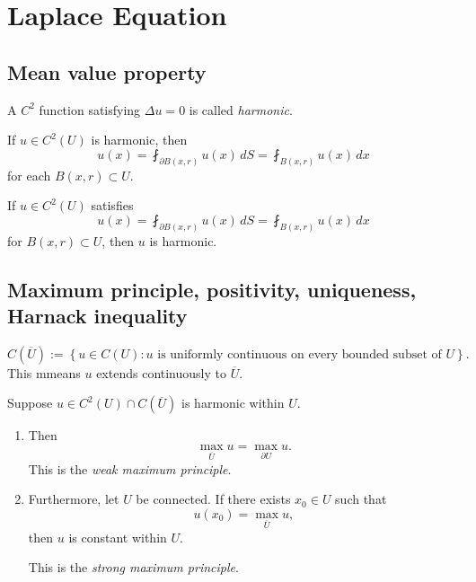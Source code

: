 \chapter{Laplace Equation}

\section{Mean value property}

\begin{definition}
A $C^2$ function satisfying $\Delta u=0$ is called \emph{harmonic}.
\end{definition}

\begin{theorem}
If $u\in C^2(U)$ is harmonic, then
$$
u(x)= \fint_{\partial B(x,r)} u(x)\,dS
= \fint_{B(x,r)} u(x)\,dx
$$
for each $B(x,r)\subset U$.
\end{theorem}

\begin{theorem}
If $u\in C^2(U)$ satisfies
$$
u(x)= \fint_{\partial B(x,r)} u(x)\,dS
= \fint_{B(x,r)} u(x)\,dx
$$
for $B(x,r)\subset U$,
then $u$ is harmonic.
\end{theorem}


\section{Maximum principle, positivity, uniqueness, Harnack inequality}

\begin{definition}
    $
    C(\overline{U})
    :=
    \left\{
    u\in C(U): u \text{ is uniformly continuous on every bounded subset of } U
    \right\}.
    $
    This mmeans $u$ extends continuously to $\overline{U}$.
    \end{definition}

\begin{theorem}
Suppose $u\in C^2(U)\cap C(\overline{U})$ is harmonic within $U$.

\begin{enumerate}
    \item Then
    $$
    \max_{\overline{U}} u = \max_{\partial U} u.
    $$
    This is the \emph{weak maximum principle}.

    \item Furthermore, let $U$ be connected. If there exists $x_0\in U$ such that
    $$
    u(x_0)=\max_{\overline{U}} u,
    $$
    then $u$ is constant within $U$.
    
    This is the \emph{strong maximum principle}.
\end{enumerate}
\end{theorem}

